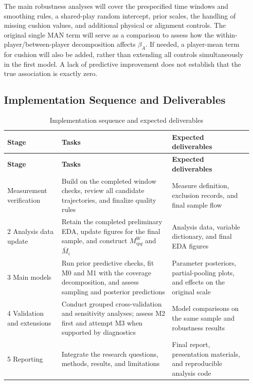\documentclass[a4paper,11pt]{article}
\newlength{\tablecontentwidth}
\begin{document}
The main robustness analyses will cover the prespecified time windows and smoothing rules, a shared-play random intercept, prior scales, the handling of missing cushion values, and additional physical or alignment controls. The original single MAN term will serve as a comparison to assess how the within-player/between-player decomposition affects $\beta_A$. If needed, a player-mean term for cushion will also be added, rather than extending all controls simultaneously in the first model. A lack of predictive improvement does not establish that the true association is exactly zero.

\subsection{Implementation Sequence and Deliverables}

{\small
\begin{longtable}{@{}P{0.19\tablecontentwidth}P{0.48\tablecontentwidth}P{0.33\tablecontentwidth}@{}}
\caption{Implementation sequence and expected deliverables}\label{tab:5}\\
\toprule
\textbf{Stage} & \textbf{Tasks} & \textbf{Expected deliverables} \\
\midrule
\endfirsthead
\toprule
\textbf{Stage} & \textbf{Tasks} & \textbf{Expected deliverables} \\
\midrule
\endhead
\bottomrule
{} Measurement verification & Build on the completed window checks, review all candidate trajectories, and finalize quality rules & Measure definition, exclusion records, and final sample flow \\[.15em]
2 Analysis data update & Retain the completed preliminary EDA, update figures for the final sample, and construct $M^W_{ipg}$ and $\bar M_i$ & Analysis data, variable dictionary, and final EDA figures \\[.15em]
3 Main models & Run prior predictive checks, fit M0 and M1 with the coverage decomposition, and assess sampling and posterior predictions & Parameter posteriors, partial-pooling plots, and effects on the original scale \\[.15em]
4 Validation and extensions & Conduct grouped cross-validation and sensitivity analyses; assess M2 first and attempt M3 when supported by diagnostics & Model comparisons on the same sample and robustness results \\[.15em]
5 Reporting & Integrate the research questions, methods, results, and limitations & Final report, presentation materials, and reproducible analysis code \\[.15em]
\end{longtable}
}
\end{document}
